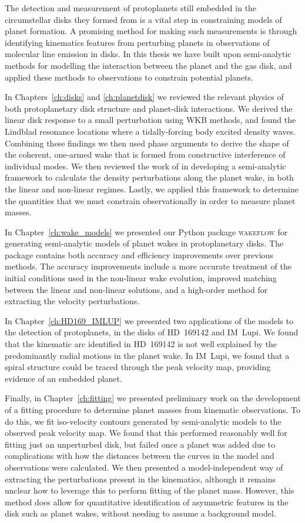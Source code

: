 The detection and measurement of protoplanets still embedded in the circumstellar disks they formed from is a vital step in constraining models of planet formation.
A promising method for making such measurements is through identifying kinematics features from perturbing planets in observations of molecular line emission in disks.
In this thesis we have built upon semi-analytic methods for modelling the interaction between the planet and the gas disk, and applied these methods to observations to constrain potential planets.

In Chapters~\ref{ch:disks} and \ref{ch:planetdisk} we reviewed the relevant physics of both protoplanetary disk structure and planet-disk interactions.
We derived the linear disk response to a small perturbation using WKB methods, and found the Lindblad resonance locations where a tidally-forcing body excited density waves.
Combining these findings we then used phase arguments to derive the shape of the coherent, one-armed wake that is formed from constructive interference of individual modes.
We then reviewed the work of \citet{goodman2001,rafikov2002a} in developing a semi-analytic framework to calculate the density perturbations along the planet wake, in both the linear and non-linear regimes.
Lastly, we applied this framework to determine the quantities that we must constrain observationally in order to measure planet masses.

In Chapter~\ref{ch:wake_models} we presented our Python package \textsc{wakeflow} for generating semi-analytic models of planet wakes in protoplanetary disks.
The package contains both accuracy and efficiency improvements over previous methods.
The accuracy improvements include a more accurate treatment of the initial conditions used in the non-linear wake evolution, improved matching between the linear and non-linear solutions, and a high-order method for extracting the velocity perturbations.

In Chapter~\ref{ch:HD169_IMLUP} we presented two applications of the models to the detection of protoplanets, in the disks of HD~169142 and IM~Lupi.
We found that the kinematic arc identified in HD~169142 is not well explained by the predominantly radial motions in the planet wake.
In IM~Lupi, we found that a spiral structure could be traced through the peak velocity map, providing evidence of an embedded planet.

Finally, in Chapter~\ref{ch:fitting} we presented preliminary work on the development of a fitting procedure to determine planet masses from kinematic observations.
To do this, we fit iso-velocity contours generated by semi-analytic models to the observed peak velocity map.
We found that this performed reasonably well for fitting just an unperturbed disk, but failed once a planet was added due to complications with how the distances between the curves in the model and observations were calculated.
We then presented a model-independent way of extracting the perturbations present in the kinematics, although it remains unclear how to leverage this to perform fitting of the planet mass.
However, this method does allow for quantitative identification of asymmetric features in the disk such as planet wakes, without needing to assume a background model.

